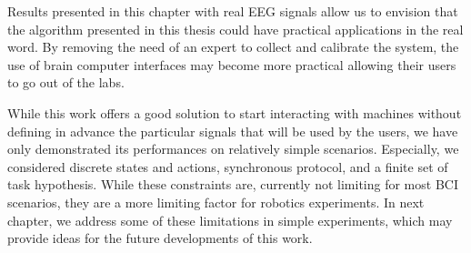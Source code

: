 
\transition

Results presented in this chapter with real EEG signals allow us to envision that the algorithm presented in this thesis could have practical applications in the real word. By removing the need of an expert to collect and calibrate the system, the use of brain computer interfaces may become more practical allowing their users to go out of the labs.

While this work offers a good solution to start interacting with machines without defining in advance the particular signals that will be used by the users, we have only demonstrated its performances on relatively simple scenarios. Especially, we considered discrete states and actions, synchronous protocol, and a finite set of task hypothesis. While these constraints are, currently not limiting for most BCI scenarios, they are a more limiting factor for robotics experiments. In next chapter, we address some of these limitations in simple experiments, which may provide ideas for the future developments of this work.














